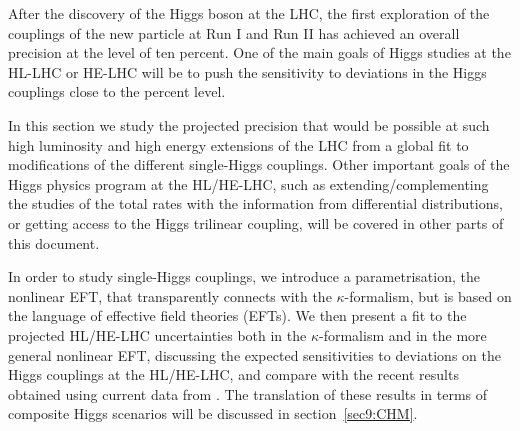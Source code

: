 After the discovery of the Higgs boson at the LHC, the first exploration of the couplings of the new particle at Run I and Run II has achieved an overall precision at the level of ten percent. One of the main goals of Higgs studies at the HL-LHC or HE-LHC will be to push the sensitivity to deviations in the Higgs couplings close to the percent level. 

In this section we study the projected precision that would be possible at such high luminosity and high energy extensions of the LHC from a global fit to modifications of the different single-Higgs couplings. Other important goals of the Higgs physics program at the HL/HE-LHC, such as extending/complementing the studies of the total rates with the information from differential distributions, or getting access to the Higgs trilinear coupling, will be covered in other parts of this document. 


In order to study single-Higgs couplings, we introduce a parametrisation, the nonlinear EFT, that transparently connects with the $\kappa$-formalism, but is based on the language of effective field theories (EFTs). 
 We then present a fit to the projected HL/HE-LHC uncertainties both in the $\kappa$-formalism and in the more general nonlinear EFT, discussing the expected sensitivities to deviations on the Higgs couplings at the HL/HE-LHC, and compare with the recent results obtained using current data from \cite{deBlas:2018tjm}. %
 The translation of these results in terms of composite Higgs scenarios will be discussed in section~\ref{sec9:CHM}.
 


